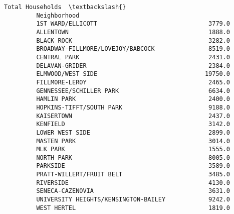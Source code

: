 \documentclass[11pt]{article}
\begin{document}
\begin{Verbatim}[commandchars=\\\{\}]
                                               Total Households  \textbackslash{}
         Neighborhood                                             
         1ST WARD/ELLICOTT                               3779.0   
         ALLENTOWN                                       1888.0   
         BLACK ROCK                                      3282.0   
         BROADWAY-FILLMORE/LOVEJOY/BABCOCK               8519.0   
         CENTRAL PARK                                    2431.0   
         DELAVAN-GRIDER                                  2384.0   
         ELMWOOD/WEST SIDE                              19750.0   
         FILLMORE-LEROY                                  2465.0   
         GENNESSEE/SCHILLER PARK                         6634.0   
         HAMLIN PARK                                     2400.0   
         HOPKINS-TIFFT/SOUTH PARK                        9188.0   
         KAISERTOWN                                      2437.0   
         KENFIELD                                        3142.0   
         LOWER WEST SIDE                                 2899.0   
         MASTEN PARK                                     3014.0   
         MLK PARK                                        1555.0   
         NORTH PARK                                      8005.0   
         PARKSIDE                                        3589.0   
         PRATT-WILLERT/FRUIT BELT                        3485.0   
         RIVERSIDE                                       4130.0   
         SENECA-CAZENOVIA                                3631.0   
         UNIVERSITY HEIGHTS/KENSINGTON-BAILEY            9242.0   
         WEST HERTEL                                     1819.0   
         

\end{Verbatim}
\end{document}
